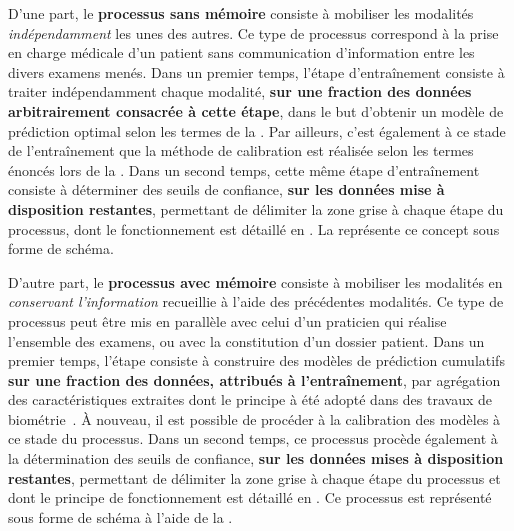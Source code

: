 D'une part, le \textbf{processus sans mémoire} consiste à mobiliser les modalités \textit{indépendamment} les unes des autres. Ce type de processus correspond à la prise en charge médicale d'un patient sans communication d'information entre les divers examens menés. Dans un premier temps, l'étape d'entraînement consiste à traiter indépendamment chaque modalité, \textbf{sur une fraction des données arbitrairement consacrée à cette étape}, dans le but d'obtenir un modèle de prédiction optimal selon les termes de la . Par ailleurs, c'est également à ce stade de l'entraînement que la méthode de calibration est réalisée selon les termes énoncés lors de la . Dans un second temps, cette même étape d'entraînement consiste à déterminer des seuils de confiance, \textbf{sur les données mise à disposition restantes}, permettant de délimiter la zone grise à chaque étape du processus, dont le fonctionnement est détaillé en . La  représente ce concept sous forme de schéma.\par

D'autre part, le \textbf{processus avec mémoire} consiste à mobiliser les modalités en \textit{conservant l'information} recueillie à l'aide des précédentes modalités. Ce type de processus peut être mis en parallèle avec celui d'un praticien qui réalise l'ensemble des examens, ou avec la constitution d'un dossier patient. Dans un premier temps, l'étape consiste à construire des modèles de prédiction cumulatifs \textbf{sur une fraction des données, attribués à l'entraînement}, par agrégation des caractéristiques extraites dont le principe à été adopté dans des travaux de biométrie~\cite{Krishneswari2012}. À nouveau, il est possible de procéder à la calibration des modèles à ce stade du processus. Dans un second temps, ce processus procède également à la détermination des seuils de confiance, \textbf{sur les données mises à disposition restantes}, permettant de délimiter la zone grise à chaque étape du processus et dont le principe de fonctionnement est détaillé en . Ce processus est représenté sous forme de schéma à l'aide de la .\par

